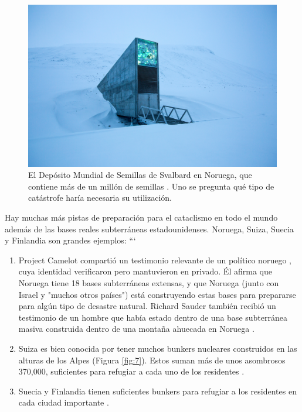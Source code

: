 \documentclass[10pt,twocolumn,letterpaper]{article}
\begin{document}
\begin{figure}[t]
\begin{center}
   \includegraphics[width=1\linewidth]{svalbard.jpg}
\end{center}
   \caption{El Depósito Mundial de Semillas de Svalbard en Noruega, que contiene más de un millón de semillas \cite{24}. Uno se pregunta qué tipo de catástrofe haría necesaria su utilización.}
\label{fig:8}
\label{fig:onecol}
\end{figure}

Hay muchas más pistas de preparación para el cataclismo en todo el mundo además de las bases reales subterráneas estadounidenses. Noruega, Suiza, Suecia y Finlandia son grandes ejemplos:
```
\begin{flushleft}
\begin{enumerate}
    \item Project Camelot compartió un testimonio relevante de un político noruego \cite{25,26}, cuya identidad verificaron pero mantuvieron en privado. Él afirma que Noruega tiene 18 bases subterráneas extensas, y que Noruega (junto con Israel y "muchos otros países") está construyendo estas bases para prepararse para algún tipo de desastre natural. Richard Sauder también recibió un testimonio de un hombre que había estado dentro de una base subterránea masiva construida dentro de una montaña ahuecada en Noruega \cite{22}.
    \item Suiza es bien conocida por tener muchos bunkers nucleares construidos en las alturas de los Alpes (Figura \ref{fig:7}). Estos suman más de unos asombrosos 370,000, suficientes para refugiar a cada uno de los residentes \cite{27}.
    \item Suecia y Finlandia tienen suficientes bunkers para refugiar a los residentes en cada ciudad importante \cite{27}.
\end{enumerate}
\end{flushleft}
\end{document}
